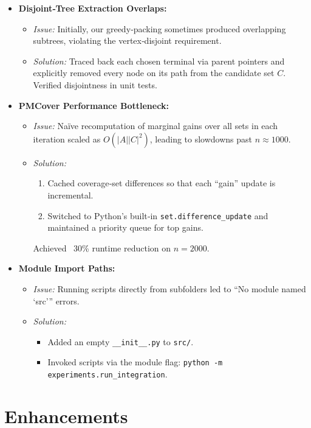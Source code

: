 \documentclass[11pt]{article}
\begin{document}
\begin{itemize}
  \item \textbf{Disjoint‐Tree Extraction Overlaps:}
    \begin{itemize}
      \item \emph{Issue:} Initially, our greedy‐packing sometimes produced overlapping subtrees, violating the vertex‐disjoint requirement.
      \item \emph{Solution:} Traced back each chosen terminal via parent pointers and explicitly removed every node on its path from the candidate set \(C\).  Verified disjointness in unit tests.
    \end{itemize}

  \item \textbf{PMCover Performance Bottleneck:}
    \begin{itemize}
      \item \emph{Issue:} Naïve recomputation of marginal gains over all sets in each iteration scaled as \(O(|A||C|^2)\), leading to slowdowns past \(n\approx1000\).
      \item \emph{Solution:}  
        \begin{enumerate}
          \item Cached coverage‐set differences so that each “gain” update is incremental.  
          \item Switched to Python’s built‐in \texttt{set.difference\_update} and maintained a priority queue for top gains.  
        \end{enumerate}  
        Achieved ~30\% runtime reduction on \(n=2000\).
    \end{itemize}

  \item \textbf{Module Import Paths:}
    \begin{itemize}
      \item \emph{Issue:} Running scripts directly from subfolders led to “No module named ‘src’” errors.
      \item \emph{Solution:}  
        \begin{itemize}
          \item Added an empty \texttt{\_\_init\_\_.py} to \texttt{src/}.  
          \item Invoked scripts via the module flag: \texttt{python -m experiments.run\_integration}.  
        \end{itemize}
    \end{itemize}
\end{itemize}
\section{Enhancements}
\end{document}
